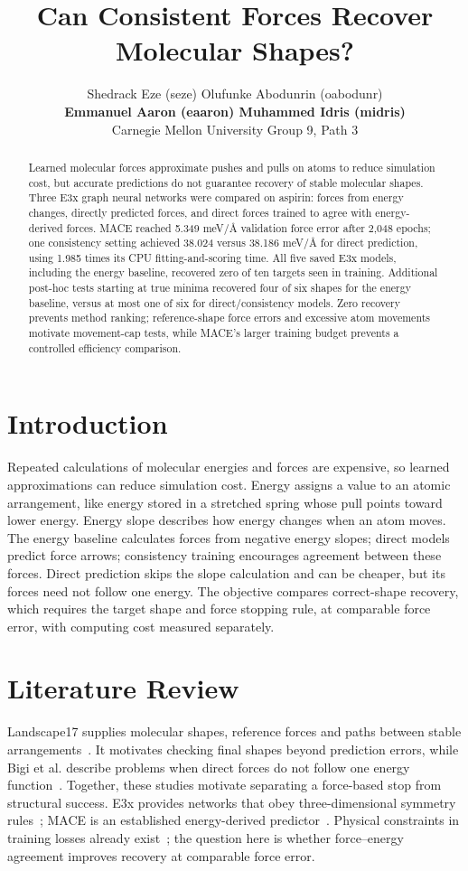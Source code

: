 \documentclass{article}
\title{Can Consistent Forces Recover Molecular Shapes?}
\author{Shedrack Eze (seze) \quad Olufunke Abodunrin (oabodunr)\\
\textbf{Emmanuel Aaron (eaaron) \quad Muhammed Idris (midris)}\\
Carnegie Mellon University \quad Group 9, Path 3}
\begin{document}
\maketitle
\begin{abstract}
Learned molecular forces approximate pushes and pulls on atoms to reduce simulation cost, but accurate predictions do not guarantee recovery of stable molecular shapes. Three E3x graph neural networks were compared on aspirin: forces from energy changes, directly predicted forces, and direct forces trained to agree with energy-derived forces. MACE reached 5.349 meV/Å validation force error after 2,048 epochs; one consistency setting achieved 38.024 versus 38.186 meV/Å for direct prediction, using 1.985 times its CPU fitting-and-scoring time. All five saved E3x models, including the energy baseline, recovered zero of ten targets seen in training. Additional post-hoc tests starting at true minima recovered four of six shapes for the energy baseline, versus at most one of six for direct/consistency models. Zero recovery prevents method ranking; reference-shape force errors and excessive atom movements motivate movement-cap tests, while MACE's larger training budget prevents a controlled efficiency comparison.
\end{abstract}
\section{Introduction}
Repeated calculations of molecular energies and forces are expensive, so learned approximations can reduce simulation cost. Energy assigns a value to an atomic arrangement, like energy stored in a stretched spring whose pull points toward lower energy. Energy slope describes how energy changes when an atom moves. The energy baseline calculates forces from negative energy slopes; direct models predict force arrows; consistency training encourages agreement between these forces. Direct prediction skips the slope calculation and can be cheaper, but its forces need not follow one energy. The objective compares correct-shape recovery, which requires the target shape and force stopping rule, at comparable force error, with computing cost measured separately.
\section{Literature Review}
Landscape17 supplies molecular shapes, reference forces and paths between stable arrangements~\cite{landscape}. It motivates checking final shapes beyond prediction errors, while Bigi et al. describe problems when direct forces do not follow one energy function~\cite{bigi}. Together, these studies motivate separating a force-based stop from structural success. E3x provides networks that obey three-dimensional symmetry rules~\cite{e3x}; MACE is an established energy-derived predictor~\cite{mace}. Physical constraints in training losses already exist~\cite{takamoto}; the question here is whether force--energy agreement improves recovery at comparable force error.
\end{document}
